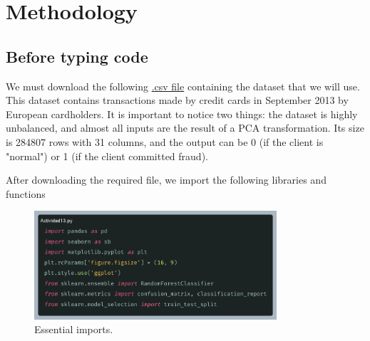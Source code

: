 \documentclass[10pt]{article}
\begin{document}
\section{Methodology}
\subsection{Before typing code}
We must download the following \href{https://www.kaggle.com/datasets/mlg-ulb/creditcardfraud?resource=download}{.csv file} containing the dataset that we will use. This dataset contains transactions made by credit cards in September 2013 by European cardholders. It is important to notice two things: the dataset is highly unbalanced, and almost all inputs are the result of a PCA transformation. Its size is 284807 rows with 31 columns, and the output can be 0 (if the client is "normal") or 1 (if the client committed fraud). \par
After downloading the required file, we import the following libraries and functions
\begin{figure}[h]
    \centering
    \includegraphics[width=90mm]{2025-03-31-10-32-53.png}
    \caption{Essential imports.}
\end{figure}

\newpage
\end{document}
